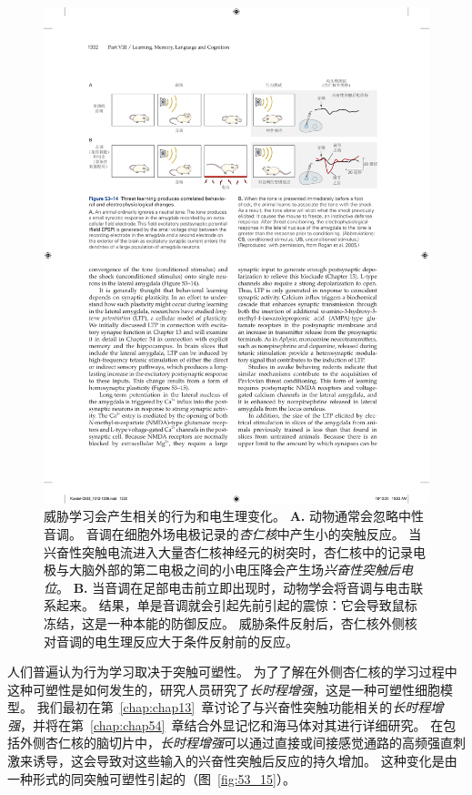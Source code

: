 \begin{figure}[htbp]
	\centering
	\includegraphics[width=1.0\linewidth]{chap53/fig_53_14}
	\caption{威胁学习会产生相关的行为和电生理变化。
		\textbf{A.} 动物通常会忽略中性音调。
		音调在细胞外场电极记录的\textit{杏仁核}中产生小的突触反应。 
		当兴奋性突触电流进入大量杏仁核神经元的树突时，杏仁核中的记录电极与大脑外部的第二电极之间的小电压降会产生场\textit{兴奋性突触后电位}。
		\textbf{B.} 当音调在足部电击前立即出现时，动物学会将音调与电击联系起来。
		结果，单是音调就会引起先前引起的震惊：它会导致鼠标冻结，这是一种本能的防御反应。
		威胁条件反射后，杏仁核外侧核对音调的电生理反应大于条件反射前的反应\cite{rogan2005distinct}。}
	\label{fig:53_14}
\end{figure}


人们普遍认为行为学习取决于突触可塑性。
为了了解在外侧杏仁核的学习过程中这种可塑性是如何发生的，研究人员研究了\textit{长时程增强}，这是一种可塑性细胞模型。
我们最初在第~\ref{chap:chap13}~章讨论了与兴奋性突触功能相关的\textit{长时程增强}，并将在第~\ref{chap:chap54}~章结合外显记忆和海马体对其进行详细研究。
在包括外侧杏仁核的脑切片中，\textit{长时程增强}可以通过直接或间接感觉通路的高频强直刺激来诱导，这会导致对这些输入的兴奋性突触后反应的持久增加。
这种变化是由一种形式的同突触可塑性引起的（图~\ref{fig:53_15}）。


